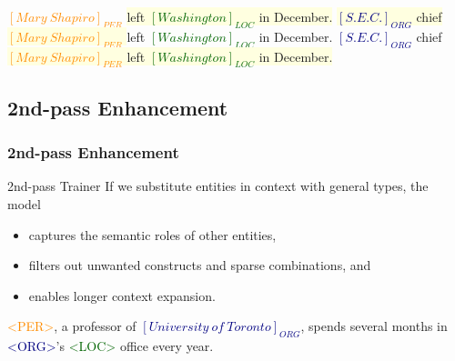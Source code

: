 \documentclass{beamer}
\begin{document}
\begin{frame}
\begin{example}
\begin{overprint}
		    \textbf{\textcolor{darkorange}{$[Mary\ Shapiro]_{PER}$}}
		    \colorbox{lightyellow}{left \textbf{\textcolor{darkgreen}{$[Washington]_{LOC}$}} in December.}
		\onslide<6>
			\colorbox{lightyellow}{
				\textbf{\textcolor{navy}{$[S.E.C.]_{ORG}$}} chief
		    	\textbf{\textcolor{darkorange}{$[Mary\ Shapiro]_{PER}$}}
		    }
		    left \textbf{\textcolor{darkgreen}{$[Washington]_{LOC}$}} in December.
		\onslide<7>
			\textbf{\textcolor{navy}{$[S.E.C.]_{ORG}$}} chief
			\colorbox{lightyellow}{
		    	\textbf{\textcolor{darkorange}{$[Mary\ Shapiro]_{PER}$}}
		    	left \textbf{\textcolor{darkgreen}{$[Washington]_{LOC}$}} in December.
		    }
	\end{overprint}
\end{example}
\end{frame}

\subsection{2nd-pass Enhancement}

\begin{frame}
\frametitle{2nd-pass Enhancement}
\begin{block}{2nd-pass Trainer}
	If we substitute entities in context with general types, the model
	\begin{itemize}
	\item captures the semantic roles of other entities,
	\item filters out unwanted constructs and sparse combinations, and
	\item enables longer context expansion.
	\end{itemize}
\end{block}
\begin{example}
	\textcolor{darkorange}{{\textless}PER{\textgreater}}, 
	a professor of \textcolor{navy}{$[University\ of\ Toronto]_{ORG}$}, 
	spends several months in \textcolor{navy}{{\textless}ORG{\textgreater}}'s 
	\textcolor{darkgreen}{{\textless}LOC{\textgreater}} office every year.
\end{example}
\end{frame}
\end{document}
